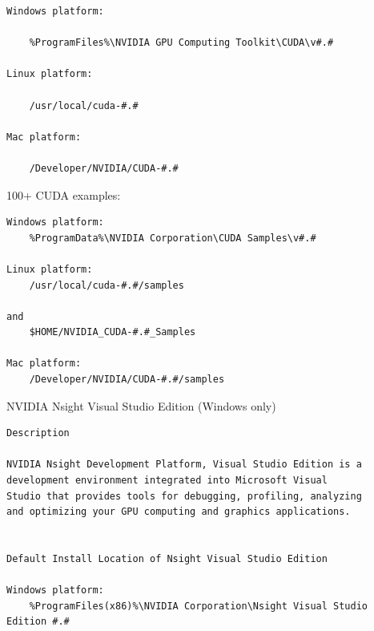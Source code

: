 \begin{verbatim}
Windows platform:

	%ProgramFiles%\NVIDIA GPU Computing Toolkit\CUDA\v#.#

Linux platform:

	/usr/local/cuda-#.#

Mac platform:

	/Developer/NVIDIA/CUDA-#.#

\end{verbatim}


100+ CUDA examples:
\begin{verbatim}
Windows platform:
	%ProgramData%\NVIDIA Corporation\CUDA Samples\v#.#

Linux platform:
	/usr/local/cuda-#.#/samples

and
	$HOME/NVIDIA_CUDA-#.#_Samples

Mac platform:
	/Developer/NVIDIA/CUDA-#.#/samples
\end{verbatim}

NVIDIA Nsight Visual Studio Edition (Windows only)
\begin{verbatim}
Description

NVIDIA Nsight Development Platform, Visual Studio Edition is a
development environment integrated into Microsoft Visual
Studio that provides tools for debugging, profiling, analyzing
and optimizing your GPU computing and graphics applications.


Default Install Location of Nsight Visual Studio Edition

Windows platform:
	%ProgramFiles(x86)%\NVIDIA Corporation\Nsight Visual Studio Edition #.#
\end{verbatim}

